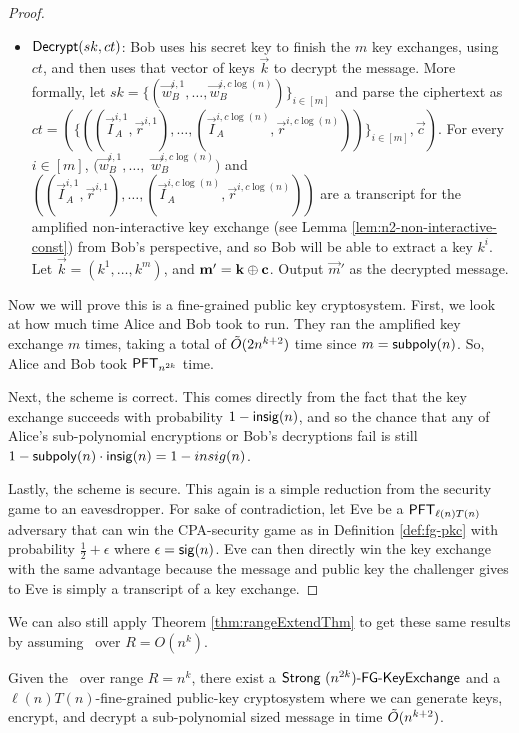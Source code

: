 \begin{proof}
\begin{itemize}
		\item $\dec(sk, ct)$: Bob uses his secret key to finish the $m$ key exchanges, using $ct$, and then uses that vector of keys $\vec k$ to decrypt the message. More formally, let $sk = \{(\vec w_B^{i, 1}, \ldots, \vec w_B^{i, c\log(n)})\}_{i \in [m]}$ and parse the ciphertext as $ct = \left( \{((\vec I_A^{i,1}, \vec r^{i, 1}), \ldots, (\vec I_A^{i,c\log(n)}, \vec r^{i, c \log(n)}))\}_{i \in [m]}, \vec c \right)$. For every $i \in [m]$, $(\vec w_B^{i, 1}, \ldots,$  $\vec w_B^{i, c\log(n)})$ and $((\vec I_A^{i,1}, \vec r^{i, 1}), \ldots, (\vec I_A^{i,c\log(n)}, \vec r^{i, c \log(n)}))$ are a transcript for the amplified non-interactive key exchange (see Lemma \ref{lem:n2-non-interactive-const}) from Bob's perspective, and so Bob will be able to extract a key $k^i$. Let $\vec k =(k^1, \ldots, k^m)$, and $\vec m' = \vec k \xor \vec c$. Output $\vec m'$ as the decrypted message.
	\end{itemize}
	
	Now we will prove this is a fine-grained public key cryptosystem. First, we look at how much time Alice and Bob took to run. They ran the amplified key exchange $m$ times, taking a total of $\~O(2n^{k+2})$ time since $m = \subpoly(n)$. So, Alice and Bob took $\PFT{n^{2k}}$ time.

	Next, the scheme is correct. This comes directly from the fact that the key exchange succeeds with probability $1 - \insig(n)$, and so the chance that any of Alice's sub-polynomial encryptions or Bob's decryptions fail is still $1 - \subpoly(n) \cdot \insig(n) = 1 - insig(n)$.
	
	Lastly, the scheme is secure. This again is a simple reduction from the security game to an eavesdropper. For sake of contradiction, let Eve be a $\PFT{\ell(n)T(n)}$ adversary that can win the CPA-security game as in Definition \ref{def:fg-pkc} with probability $\frac 1 2 + \epsilon$ where $\epsilon = \sig(n)$. Eve can then directly win the key exchange with the same advantage because the message and public key the challenger gives to Eve is simply a transcript of a key exchange.
\end{proof}

We can also still apply Theorem \ref{thm:rangeExtendThm} to get these same results by assuming \strongzkc~over $R = O(n^k)$.

\begin{corollary}
	Given the \strongzkc~over range $R = n^k$, there exist a $\strongfgkeyxc{n^{2k}}$ and a $\ell(n)T(n)$-fine-grained public-key cryptosystem where we can generate keys, encrypt, and decrypt a sub-polynomial sized message in time $\~O(n^{k+2})$.
\end{corollary}

